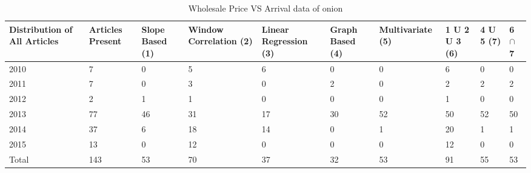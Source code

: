 \documentclass[a4paper,10pt]{report}
\begin{document}
	\begin{table}[]
	\centering
	\resizebox{\textwidth}{!}
	{\begin{tabular}{|l|l|l|l|l|l|l|l|l|l|}
	\hline
	Distribution of All Articles & Articles Present & Slope Based (1) & Window Correlation (2) & Linear Regression (3) & Graph Based (4) & Multivariate (5) & 1 U 2 U 3 (6) & 4 U 5 (7) & 6  $\cap$ 7 \\
	\hline
	2010                         & 7                & 0           & 5           & 6                 & 0           & 0             & 6         & 0     & 0                                     \\
	\hline
	2011                         & 7                & 0           & 3           & 0                 & 2           & 0             & 2         & 2     & 2                                     \\
	\hline
	2012                         & 2                & 1           & 1           & 0                 & 0           & 0             & 1         & 0     & 0                                     \\
	\hline
	2013                         & 77               & 46          & 31          & 17                & 30          & 52            & 50        & 52    & 50                                    \\
	\hline
	2014                         & 37               & 6           & 18          & 14                & 0           & 1             & 20        & 1     & 1                                     \\
	\hline
	2015                         & 13               & 0           & 12          & 0                 & 0           & 0             & 12        & 0     & 0                                     \\
	\hline
	Total                        & 143              & 53          & 70          & 37                & 32          & 53            & 91        & 55    & 53                                   \\
	\hline
	\end{tabular}}	
	\caption{ Wholesale Price VS Arrival data of onion}
	\label{WholesaleVsArrival}
	\end{table}
	
	
	
\end{document}
